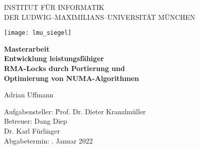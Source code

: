 \begin{center}

    \vspace*{-2cm}

    {\Huge INSTITUT FÜR INFORMATIK\\[1mm]}
    DER LUDWIG--MAXIMILIANS--UNIVERSITÄT MÜNCHEN\\

    \vspace*{1cm}

    \texttt{[image: lmu\_siegel]}

    \vspace*{2cm}

    {\Large \textbf{Masterarbeit}}\\

    \vspace{2.0cm}
    {\huge \textbf{Entwicklung leistungsfähiger}}\\
    \vspace*{3mm}
    {\huge \textbf{RMA-Locks durch Portierung und}}\\
    \vspace*{3mm}
    {\huge \textbf{Optimierung von NUMA-Algorithmen}}\\
    \vspace{1.5cm}

    {\LARGE Adrian Uffmann}
    \vspace{2cm}

    \parbox{1cm}{
        \begin{large}
            \begin{tabbing}
                Aufgabensteller: \hspace{.5cm} \=Prof. Dr. Dieter Kranzlmüller\\[2mm]
                Betreuer:
                \> Dang Diep\\ %
                \> Dr. Karl Fürlinger\\[5mm]
                Abgabetermin: . Januar 2022\\
            \end{tabbing}
        \end{large}}\\
    \vspace{5mm}

\end{center}
